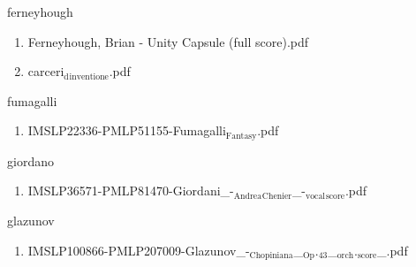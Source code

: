 \documentclass[11pt]{article}
\begin{document}
\item ferneyhough
\label{sec-1-1-1-1-44-30}
\begin{enumerate}
\item Ferneyhough, Brian - Unity Capsule (full score).pdf
\label{sec-1-1-1-1-44-30-1}

\item carceri$_{\text{d}}$$_{\text{inventione}}$.pdf
\label{sec-1-1-1-1-44-30-2}
\end{enumerate}

\item fumagalli
\label{sec-1-1-1-1-44-31}
\begin{enumerate}
\item IMSLP22336-PMLP51155-Fumagalli$_{\text{Fantasy}}$.pdf
\label{sec-1-1-1-1-44-31-1}
\end{enumerate}

\item giordano
\label{sec-1-1-1-1-44-32}
\begin{enumerate}
\item IMSLP36571-PMLP81470-Giordani\_-$_{\text{Andrea}}$$_{\text{Chenier}}$\_-$_{\text{vocal}}$$_{\text{score}}$.pdf
\label{sec-1-1-1-1-44-32-1}
\end{enumerate}

\item glazunov
\label{sec-1-1-1-1-44-33}
\begin{enumerate}
\item IMSLP100866-PMLP207009-Glazunov\_-$_{\text{Chopiniana}}$\_$_{\text{Op}}$.$_{\text{43}}$\_$_{\text{orch}}$.$_{\text{score}}$\_.pdf
\label{sec-1-1-1-1-44-33-1}
\end{enumerate}
\end{document}
